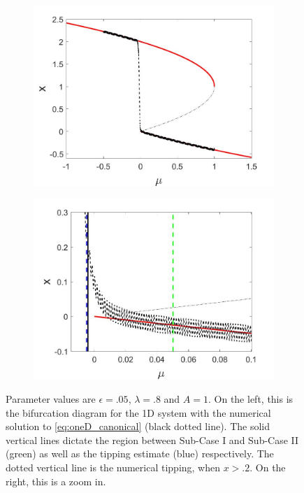 \begin{figure}[H]
\centering
\begin{subfigure}{.5\textwidth}
  \centering
  \includegraphics[width=\linewidth]{oneD/slowosc_bif_diagram_small.jpg}
  \caption{}
\end{subfigure}%
\begin{subfigure}{.5\textwidth}
  \centering
  \includegraphics[width=\linewidth]{oneD/slowosc_bif_diagram_small_zoom.jpg}
  \caption{}
\end{subfigure}
\caption{Parameter values are $\epsilon=.05$, $\lambda=.8$ and $A=1$. On the left, this is the bifurcation diagram for the 1D system with the numerical solution to \eqref{eq:oneD_canonical} (black dotted line). The solid vertical lines dictate the region between Sub-Case I and Sub-Case II (green) as well as the tipping estimate (blue) respectively. The dotted vertical line is the numerical tipping, when $x>.2$. On the right, this is a zoom in.}
\label{fig:oneD_slowosc_numerical_small}
\end{figure}

